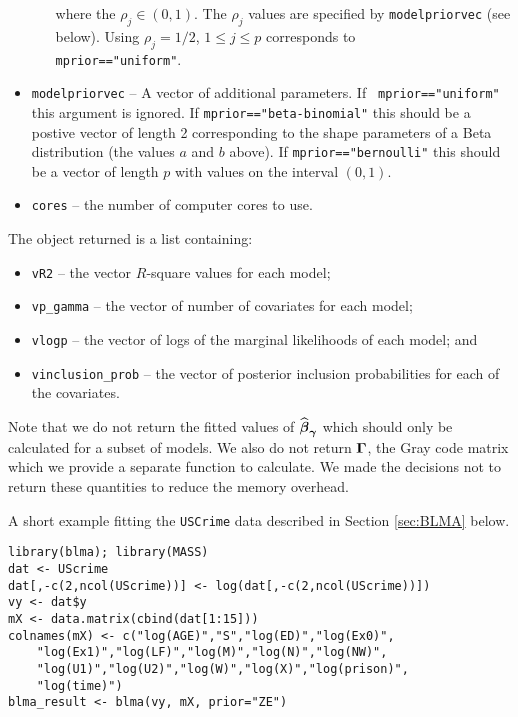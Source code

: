 \begin{itemize}
\begin{itemize}
        \noindent where the $\rho_j\in(0,1)$. The $\rho_j$ values are specified
        by {\tt modelpriorvec} (see below). Using $\rho_j = 1/2$, $1\le j\le p$
        corresponds to \\ {\tt mprior=="uniform"}.
	\end{itemize}
	
    \item {\tt modelpriorvec} -- A vector of additional parameters. If 
    {\tt
        mprior=="uniform"} this argument is ignored.
    If {\tt mprior=="beta-binomial"} this should be a postive vector of length
    2 corresponding to the shape parameters of a Beta distribution (the values
    $a$ and $b$ above). If {\tt mprior=="bernoulli"} this should be a vector of
    length $p$ with values on the interval $(0,1)$.
	
	\item {\tt cores} -- the number of computer cores to use.
\end{itemize}

\noindent 
The object returned is a 
list containing:
\begin{itemize}
	\item 
	{\tt vR2} -- the vector $R$-square values for each model; 
	
	\item 
	{\tt vp\_gamma} -- the vector of number of covariates for each model;
	
	\item 
	{\tt vlogp} -- the vector of logs of the marginal likelihoods of each model; and
	
	\item 
	{\tt vinclusion\_prob} -- the vector of posterior inclusion probabilities for each of the covariates. 
\end{itemize}

\noindent Note that we do not return the fitted values of
$\widehat{{\boldsymbol \beta}}_{{\boldsymbol \gamma}}$ which should only be calculated for a subset of
models. We also do not return ${\boldsymbol \Gamma}$, the Gray code matrix which we provide
a separate function to calculate. We made the decisions not to return these
quantities to reduce the memory overhead.

A short example fitting the {\tt USCrime} data described in Section
\ref{sec:BLMA}  below.

\begin{verbatim}
library(blma); library(MASS)
dat <- UScrime
dat[,-c(2,ncol(UScrime))] <- log(dat[,-c(2,ncol(UScrime))])
vy <- dat$y
mX <- data.matrix(cbind(dat[1:15]))
colnames(mX) <- c("log(AGE)","S","log(ED)","log(Ex0)",
    "log(Ex1)","log(LF)","log(M)","log(N)","log(NW)",
    "log(U1)","log(U2)","log(W)","log(X)","log(prison)",
    "log(time)") 
blma_result <- blma(vy, mX, prior="ZE")
\end{verbatim}

